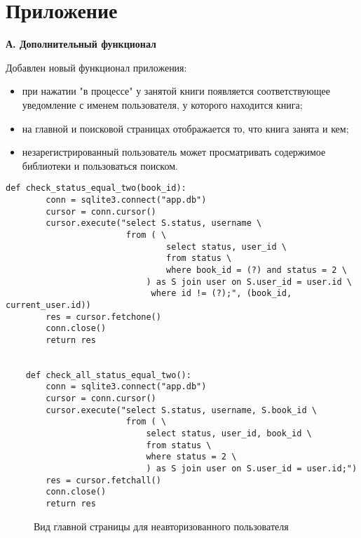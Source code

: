 \newpage

\section*{Приложение}%

{\bf А. Дополнительный функционал}

Добавлен новый функционал приложения:
\begin{itemize}
	\item при нажатии "в процессе" у занятой книги появляется соответствующее уведомление с именем пользователя, у которого находится книга;
	\item на главной и поисковой страницах отображается то, что книга занята и кем;
	\item незарегистрированный пользователь может просматривать содержимое библиотеки и пользоваться поиском.
\end{itemize}

\begin{lstlisting}[label=some-code, caption=Новые функции класса Status]
def check_status_equal_two(book_id):
        conn = sqlite3.connect("app.db")
        cursor = conn.cursor()
        cursor.execute("select S.status, username \
                        from ( \
                                select status, user_id \
                                from status \
                                where book_id = (?) and status = 2 \
                            ) as S join user on S.user_id = user.id \
                             where id != (?);", (book_id, current_user.id))
        res = cursor.fetchone()
        conn.close()
        return res


    def check_all_status_equal_two():
        conn = sqlite3.connect("app.db")
        cursor = conn.cursor()
        cursor.execute("select S.status, username, S.book_id \
                        from ( \
                            select status, user_id, book_id \
                            from status \
                            where status = 2 \
                            ) as S join user on S.user_id = user.id;") 
        res = cursor.fetchall()
        conn.close()
        return res
\end{lstlisting}


\begin{figure}[H]
\center{\texttt{[image: p1.png]}}
\caption{Вид главной страницы для неавторизованного пользователя}
\label{fig:image}
\end{figure}

